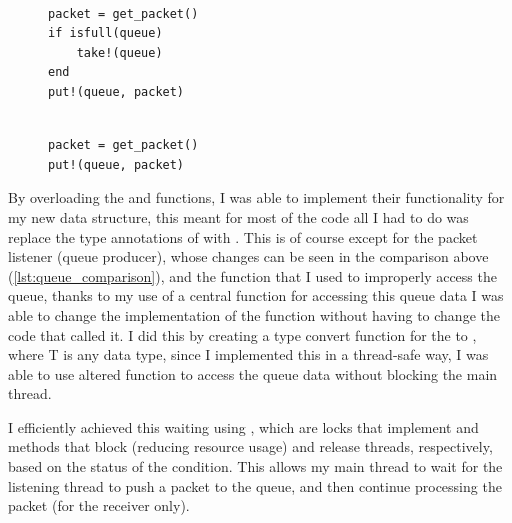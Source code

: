 \begin{figure}[!h]
    \begin{minipage}{0.5\textwidth}
        \centering
        \begin{verbatim}

packet = get_packet()
if isfull(queue)
    take!(queue)
end
put!(queue, packet)

        \end{verbatim}
    \end{minipage}
    \begin{minipage}{0.5\textwidth}
        \centering
        \begin{verbatim}

packet = get_packet()
put!(queue, packet)

        \end{verbatim}
    \end{minipage}
\end{figure}
\label{lst:queue_comparison}

By overloading the  and  functions, I was able to implement their functionality for my new data structure, this meant for most of the code all I had to do was replace the type annotations of  with . This is of course except for the packet listener (queue producer), whose changes can be seen in the comparison above (\ref{lst:queue_comparison}), and the  function that I used to improperly access the queue, thanks to my use of a central function for accessing this queue data I was able to change the implementation of the function without having to change the code that called it. I did this by creating a type convert function for the  to , where T is any data type, since I implemented this in a thread-safe way, I was able to use altered  function to access the queue data without blocking the main thread.

I efficiently achieved this waiting using , which are locks that implement  and  methods that block (reducing resource usage) and release threads, respectively, based on the status of the condition. This allows my main thread to wait for the listening thread to push a packet to the queue, and then continue processing the packet (for the receiver only).

